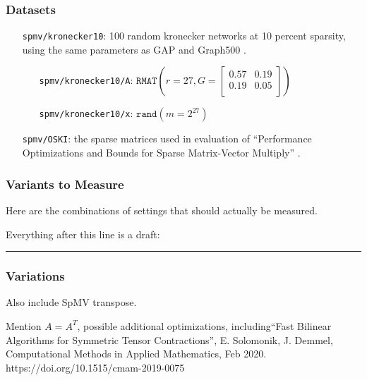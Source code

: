 \documentclass{article}
\begin{document}
\subsubsection{Datasets}

\begin{itemize}
	\item[\texttt{spmv/kronecker10}:] 100 random kronecker networks at 10 percent sparsity, using the
	same parameters as GAP and Graph500 \cite{noauthor_graph_nodate}.
	\begin{itemize}
		\item[\texttt{spmv/kronecker10/A}:] $\texttt{RMAT}\left(r=27, G = \left[\begin{array}{cc}
			0.57 & 0.19 \\
			0.19 & 0.05 \\
		\end{array}\right]\right)$
		\item[\texttt{spmv/kronecker10/x}:] $\texttt{rand}\left(m = 2^{27}\right)$
	\end{itemize}
	\item[\texttt{spmv/OSKI}:] the sparse matrices used in evaluation of
	``Performance Optimizations and Bounds for Sparse Matrix-Vector Multiply'' \cite{vuduc_performance_2002}.
\end{itemize}

\subsubsection{Variants to Measure}

Here are the combinations of settings that should actually be measured.


Everything after this line is a draft:

\noindent\rule{\textwidth}{1pt}

\subsubsection{Variations}
    Also include SpMV transpose.

    Mention $A=A^T$, possible additional optimizations,
    including``Fast Bilinear Algorithms for Symmetric Tensor 
    Contractions'', E. Solomonik, J. Demmel, Computational Methods
    in Applied Mathematics, Feb 2020.
    \newline
    https://doi.org/10.1515/cmam-2019-0075
\end{document}
